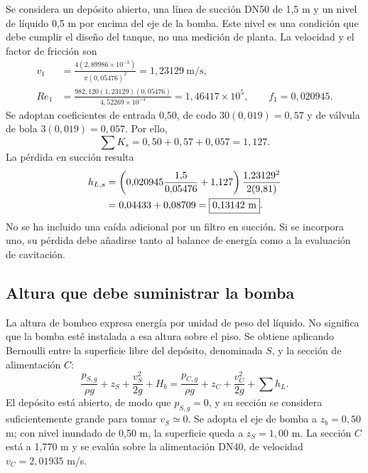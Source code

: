 Se considera un depósito abierto, una línea de succión DN50 de 1,5 m
y un nivel de líquido 0,5 m por encima del eje de la bomba. Este nivel
es una condición que debe cumplir el diseño del tanque, no una
medición de planta. La velocidad y el factor de fricción son
\begin{align}
 v_1&=\frac{4(2{,}89986\times10^{-3})}{\pi(0{,}05476)^2}
 =1{,}23129\ \mathrm{m/s},\\
 Re_1&=\frac{982{,}120(1{,}23129)(0{,}05476)}{4{,}52269\times10^{-4}}
 =1{,}46417\times10^5,\qquad f_1=0{,}020945.
\end{align}
Se adoptan coeficientes de entrada 0,50, de codo $30(0{,}019)=0{,}57$
y de válvula de bola $3(0{,}019)=0{,}057$. Por ello,
\begin{equation}
 \sum K_s=0{,}50+0{,}57+0{,}057=1{,}127.
\end{equation}
La pérdida en succión resulta
\begin{align}
 h_{L,s}&=\left(0{,}020945\frac{1{,}5}{0{,}05476}+1{,}127\right)
 \frac{1{,}23129^2}{2(9{,}81)}\notag\\
 &=0{,}04433+0{,}08709=\boxed{0{,}13142\ \mathrm{m}}.
 \label{eq:man-asp-hs}
\end{align}
No se ha incluido una caída adicional por un filtro en succión. Si se
incorpora uno, su pérdida debe añadirse tanto al balance de energía como
a la evaluación de cavitación.

\subsection{Altura que debe suministrar la bomba}
\label{sec:man-asp-bomba}

La altura de bombeo expresa energía por unidad de peso del líquido. No
significa que la bomba esté instalada a esa altura sobre el piso.
Se obtiene aplicando Bernoulli entre la superficie libre del depósito,
denominada $S$, y la sección de alimentación $C$:
\begin{equation}
 \frac{p_{S,g}}{\rho g}+z_S+\frac{v_S^2}{2g}+H_b
 =\frac{p_{C,g}}{\rho g}+z_C+\frac{v_C^2}{2g}+\sum h_L.
 \label{eq:man-asp-bern-global}
\end{equation}
El depósito está abierto, de modo que $p_{S,g}=0$, y su sección se
considera suficientemente grande para tomar $v_S\simeq0$.
Se adopta el eje de bomba a $z_b=0{,}50$ m; con nivel inundado de 0,50 m,
la superficie queda a $z_S=1{,}00$ m. La sección $C$ está a 1,770 m
y se evalúa sobre la alimentación DN40, de velocidad $v_C=2{,}01935$ m/s.

